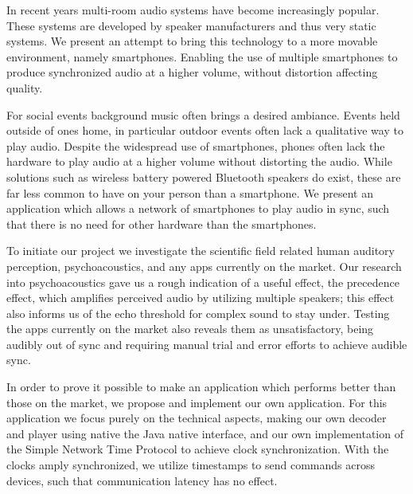 In recent years multi-room audio systems have become increasingly popular.
These systems are developed by speaker manufacturers and thus very static systems.
We present an attempt to bring this technology to a more movable environment, namely smartphones.
Enabling the use of multiple smartphones to produce synchronized audio at a higher volume, without distortion affecting quality.

For social events background music often brings a desired ambiance.
Events held outside of ones home, in particular outdoor events often lack a qualitative way to play audio.
Despite the widespread use of smartphones, phones often lack the hardware to play audio at a higher volume without distorting the audio. 
While solutions such as wireless battery powered Bluetooth speakers do exist, these are far less common to have on your person than a smartphone.
We present an application which allows a network of smartphones to play audio in sync, such that there is no need for other hardware than the smartphones.

\bigskip \noindent
To initiate our project we investigate the scientific field related human auditory perception, psychoacoustics, and any apps currently on the market.
Our research into psychoacoustics gave us a rough indication of a useful effect, the precedence effect, which amplifies perceived audio by utilizing multiple speakers; this effect also informs us of the echo threshold for complex sound to stay under.
Testing the apps currently on the market also reveals them as unsatisfactory, being audibly out of sync and requiring manual trial and error efforts to achieve audible sync. 


\bigskip \noindent
In order to prove it possible to make an application which performs better than those on the market, we propose and implement our own application.
For this application we focus purely on the technical aspects, making our own decoder and player using native the Java native interface, and our own implementation of the Simple Network Time Protocol to achieve clock synchronization.
With the clocks amply synchronized, we utilize timestamps to send commands across devices, such that communication latency has no effect.

